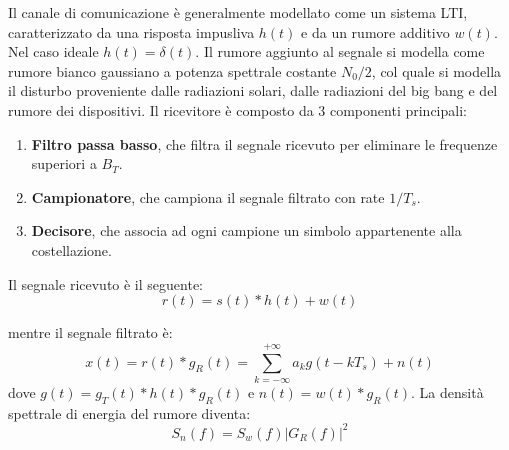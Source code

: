 \begin{center}
\end{center}



Il canale di comunicazione è generalmente modellato come un sistema LTI, caratterizzato da una risposta impusliva $h(t)$ e da un rumore additivo $w(t)$.
Nel caso ideale $h(t) = \delta (t)$.
Il rumore aggiunto al segnale si modella come rumore bianco gaussiano a potenza spettrale costante $N_0/2$, col quale si modella il disturbo proveniente dalle radiazioni solari, dalle radiazioni del big bang e del rumore dei dispositivi.
Il ricevitore è composto da 3 componenti principali:
\begin{enumerate}
    \item \textbf{Filtro passa basso}, che filtra il segnale ricevuto per eliminare le frequenze superiori a $B_T$.
    \item \textbf{Campionatore}, che campiona il segnale filtrato con rate $1/T_s$. 
    \item \textbf{Decisore}, che associa ad ogni campione un simbolo appartenente alla costellazione.
\end{enumerate}
Il segnale ricevuto è il seguente:
\[
    r(t) = s(t) \ast h(t) + w(t)
\]

mentre il segnale filtrato è:
\[
    x(t) = r(t) \ast g_R(t) = \sum_{k=-\infty}^{+\infty} a_k g(t - kT_s) + n(t)
\]
dove $g(t) = g_T(t) \ast h(t) \ast g_R(t)$ e $n(t) = w(t) \ast g_R(t)$. La densità spettrale di energia del rumore diventa:
\[
    S_n(f) = S_w(f) |G_R(f)|^2
\]



